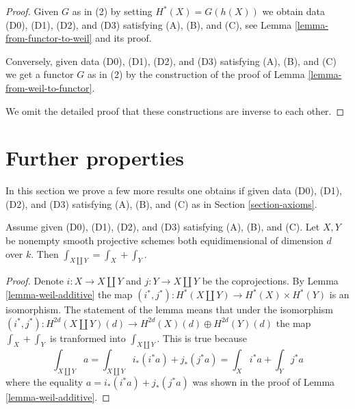 \begin{proof}
Given $G$ as in (2) by setting $H^*(X) = G(h(X))$ we obtain data
(D0), (D1), (D2), and (D3) satisfying (A), (B), and (C),
see Lemma \ref{lemma-from-functor-to-weil} and its proof.

\medskip\noindent
Conversely, given data (D0), (D1), (D2), and (D3)
satisfying (A), (B), and (C) we get a functor $G$ as in (2)
by the construction of the proof of Lemma \ref{lemma-from-weil-to-functor}.

\medskip\noindent
We omit the detailed proof that these constructions are inverse
to each other.
\end{proof}











\section{Further properties}
\label{section-further}

\noindent
In this section we prove a few more results one obtains if
given data (D0), (D1), (D2), and (D3) satisfying (A), (B), and (C) as in
Section \ref{section-axioms}.

\begin{lemma}
\label{lemma-trace-disjoint-union}
Assume given (D0), (D1), (D2), and (D3) satisfying (A), (B), and (C).
Let $X, Y$ be nonempty smooth projective schemes both equidimensional
of dimension $d$ over $k$. Then $\int_{X \amalg Y} = \int_X + \int_Y$.
\end{lemma}

\begin{proof}
Denote $i : X \to X \amalg Y$ and $j : Y \to X \amalg Y$ be the coprojections.
By Lemma \ref{lemma-weil-additive} the map
$(i^*, j^*) : H^*(X \amalg Y) \to H^*(X) \times H^*(Y)$ is an isomorphism.
The statement of the lemma means that under the isomorphism
$(i^*, j^*) : H^{2d}(X \amalg Y)(d) \to H^{2d}(X)(d) \oplus H^{2d}(Y)(d)$
the map $\int_X + \int_Y$ is tranformed into $\int_{X \amalg Y}$.
This is true because
$$
\int_{X \amalg Y} a =
\int_{X \amalg Y} i_*(i^*a) + j_*(j^*a) =
\int_X i^*a + \int_Y j^*a
$$
where the equality $a = i_*(i^*a) + j_*(j^*a)$ was shown in
the proof of Lemma \ref{lemma-weil-additive}.
\end{proof}

